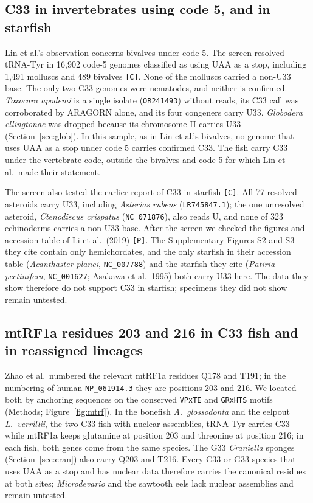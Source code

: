 \documentclass[11pt, a4paper]{article}
\begin{document}
\subsection{C33 in invertebrates using code 5, and in starfish}\label{sec:code5}
Lin et al.'s observation concerns bivalves under code 5. The screen resolved tRNA-Tyr in 16,902 code-5 genomes classified as using UAA as a stop, including 1,491 molluscs and 489 bivalves \texttt{[C]}. None of the molluscs carried a non-U33 base. The only two C33 genomes were nematodes, and neither is confirmed. \textit{Toxocara apodemi} is a single isolate (\texttt{OR241493}) without reads, its C33 call was corroborated by ARAGORN alone, and its four congeners carry U33. \textit{Globodera ellingtonae} was dropped because its chromosome II carries U33 (Section~\ref{sec:glob}). In this sample, as in Lin et al.'s bivalves, no genome that uses UAA as a stop under code 5 carries confirmed C33. The fish carry C33 under the vertebrate code, outside the bivalves and code 5 for which Lin et al.\ made their statement.

The screen also tested the earlier report of C33 in starfish \texttt{[C]}. All 77 resolved asteroids carry U33, including \textit{Asterias rubens} (\texttt{LR745847.1}); the one unresolved asteroid, \textit{Ctenodiscus crispatus} (\texttt{NC\_071876}), also reads U, and none of 323 echinoderms carries a non-U33 base. After the screen we checked the figures and accession table of Li et al.\ (2019) \texttt{[P]}. The Supplementary Figures S2 and S3 they cite contain only hemichordates, and the only starfish in their accession table (\textit{Acanthaster planci}, \texttt{NC\_007788}) and the starfish they cite (\textit{Patiria pectinifera}, \texttt{NC\_001627}; Asakawa et al.\ 1995) both carry U33 here. The data they show therefore do not support C33 in starfish; specimens they did not show remain untested.

\subsection{mtRF1a residues 203 and 216 in C33 fish and in reassigned lineages}\label{sec:mtrf}
Zhao et al.\ numbered the relevant mtRF1a residues Q178 and T191; in the numbering of human \texttt{NP\_061914.3} they are positions 203 and 216. We located both by anchoring sequences on the conserved \texttt{VPxTE} and \texttt{GRxHTS} motifs (Methods; Figure~\ref{fig:mtrf}). In the bonefish \textit{A.\ glossodonta} and the eelpout \textit{L.\ verrillii}, the two C33 fish with nuclear assemblies, tRNA-Tyr carries C33 while mtRF1a keeps glutamine at position 203 and threonine at position 216; in each fish, both genes come from the same species. The G33 \textit{Craniella} sponges (Section~\ref{sec:cran}) also carry Q203 and T216. Every C33 or G33 species that uses UAA as a stop and has nuclear data therefore carries the canonical residues at both sites; \textit{Microdevario} and the sawtooth eels lack nuclear assemblies and remain untested.
\end{document}
